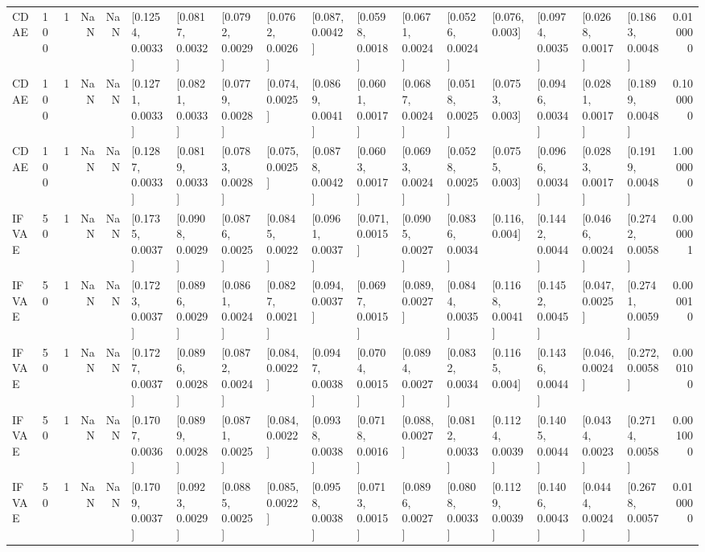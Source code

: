 \begin{tabular}{lllrrllllllllllllr}
    CDAE &  100 &     1 &   NaN &   NaN &  [0.1254, 0.0033] &  [0.0817, 0.0032] &  [0.0792, 0.0029] &  [0.0762, 0.0026] &   [0.087, 0.0042] &  [0.0598, 0.0018] &  [0.0671, 0.0024] &  [0.0526, 0.0024] &    [0.076, 0.003] &  [0.0974, 0.0035] &  [0.0268, 0.0017] &  [0.1863, 0.0048] &  0.010000 \\
    CDAE &  100 &     1 &   NaN &   NaN &  [0.1271, 0.0033] &  [0.0821, 0.0033] &  [0.0779, 0.0028] &   [0.074, 0.0025] &  [0.0869, 0.0041] &  [0.0601, 0.0017] &  [0.0687, 0.0024] &  [0.0518, 0.0025] &   [0.0753, 0.003] &  [0.0946, 0.0034] &  [0.0281, 0.0017] &  [0.1899, 0.0048] &  0.100000 \\
    CDAE &  100 &     1 &   NaN &   NaN &  [0.1287, 0.0033] &  [0.0819, 0.0033] &  [0.0783, 0.0028] &   [0.075, 0.0025] &  [0.0878, 0.0042] &  [0.0603, 0.0017] &  [0.0693, 0.0024] &  [0.0528, 0.0025] &   [0.0755, 0.003] &  [0.0966, 0.0034] &  [0.0283, 0.0017] &  [0.1919, 0.0048] &  1.000000 \\
   IFVAE &   50 &     1 &   NaN &   NaN &  [0.1735, 0.0037] &  [0.0908, 0.0029] &  [0.0876, 0.0025] &  [0.0845, 0.0022] &  [0.0961, 0.0037] &   [0.071, 0.0015] &  [0.0905, 0.0027] &  [0.0836, 0.0034] &    [0.116, 0.004] &  [0.1442, 0.0044] &  [0.0466, 0.0024] &  [0.2742, 0.0058] &  0.000001 \\
   IFVAE &   50 &     1 &   NaN &   NaN &  [0.1723, 0.0037] &  [0.0896, 0.0029] &  [0.0861, 0.0024] &  [0.0827, 0.0021] &   [0.094, 0.0037] &  [0.0697, 0.0015] &   [0.089, 0.0027] &  [0.0844, 0.0035] &  [0.1168, 0.0041] &  [0.1452, 0.0045] &   [0.047, 0.0025] &  [0.2741, 0.0059] &  0.000010 \\
   IFVAE &   50 &     1 &   NaN &   NaN &  [0.1727, 0.0037] &  [0.0896, 0.0028] &  [0.0872, 0.0024] &   [0.084, 0.0022] &  [0.0947, 0.0038] &  [0.0704, 0.0015] &  [0.0894, 0.0027] &  [0.0832, 0.0034] &   [0.1165, 0.004] &  [0.1436, 0.0044] &   [0.046, 0.0024] &   [0.272, 0.0058] &  0.000100 \\
   IFVAE &   50 &     1 &   NaN &   NaN &  [0.1707, 0.0036] &  [0.0899, 0.0028] &  [0.0871, 0.0025] &   [0.084, 0.0022] &  [0.0938, 0.0038] &  [0.0718, 0.0016] &   [0.088, 0.0027] &  [0.0812, 0.0033] &  [0.1124, 0.0039] &  [0.1405, 0.0044] &  [0.0434, 0.0023] &  [0.2714, 0.0058] &  0.001000 \\
   IFVAE &   50 &     1 &   NaN &   NaN &  [0.1709, 0.0037] &  [0.0923, 0.0029] &  [0.0885, 0.0025] &   [0.085, 0.0022] &  [0.0958, 0.0038] &  [0.0713, 0.0015] &  [0.0896, 0.0027] &  [0.0808, 0.0033] &  [0.1129, 0.0039] &  [0.1406, 0.0043] &  [0.0444, 0.0024] &  [0.2678, 0.0057] &  0.010000 \\

\end{tabular}
